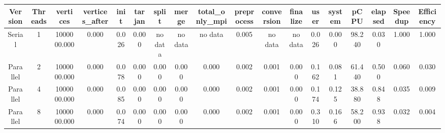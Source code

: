 \begin{tabular}{|c|c|c|c|c|c|c|c|c|c|c|c|c|c|c|c|c|c|}
\toprule
 Version &  Threads &    vertices &  vertices\_after &  init &  tarjan &   split &   merge & total\_only\_mpi &  preprocess & conversion & finalize &  user &  system &   pCPU &  elapsed &  Speedup &  Efficiency \\
\midrule
  Serial &        1 & 1000000.000 &           0.000 & 0.026 &   0.000 & no data & no data &        no data &       0.005 &    no data &  no data & 0.026 &   0.000 & 98.240 &    0.030 &    1.000 &       1.000 \\
Parallel &        2 & 1000000.000 &           0.000 & 0.078 &   0.000 &   0.000 &   0.000 &          0.000 &       0.002 &      0.001 &    0.000 & 0.162 &   0.081 & 61.440 &    0.500 &    0.060 &       0.030 \\
Parallel &        4 & 1000000.000 &           0.000 & 0.085 &   0.000 &   0.000 &   0.000 &          0.000 &       0.002 &      0.001 &    0.000 & 0.174 &   0.125 & 38.880 &    0.848 &    0.035 &       0.009 \\
Parallel &        8 & 1000000.000 &           0.000 & 0.074 &   0.000 &   0.000 &   0.000 &          0.000 &       0.002 &      0.001 &    0.000 & 0.310 &   0.166 & 58.200 &    0.938 &    0.032 &       0.004 \\
\bottomrule
\end{tabular}
